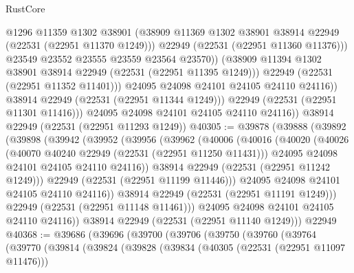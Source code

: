\begin{lexlean}{RustCore}
\begin{coremodule}
                        @1296
                        @11359
                        @1302
                        @38901
                        (@38909 @11369 @1302 @38901 @38914 @22949 (@22531 (@22951 @11370 @1249)))
                        @22949
                        (@22531 (@22951 @11360 @11376)))
                      @23549
                      @23552
                      @23555
                      @23559
                      @23564
                      @23570))
                  (@38909 @11394 @1302 @38901 @38914 @22949 (@22531 (@22951 @11395 @1249)))
                  @22949
                  (@22531 (@22951 @11352 @11401)))
                @24095
                @24098
                @24101
                @24105
                @24110
                @24116))
            @38914
            @22949
            (@22531 (@22951 @11344 @1249)))
          @22949
          (@22531 (@22951 @11301 @11416)))
        @24095
        @24098
        @24101
        @24105
        @24110
        @24116))
    @38914
    @22949
    (@22531 (@22951 @11293 @1249))
@40305 := @39878
    (@39888
      (@39892
        (@39898
          (@39942
            (@39952
              (@39956
                (@39962
                  (@40006
                    (@40016
                      (@40020
                        (@40026
                          (@40070 @40240 @22949 (@22531 (@22951 @11250 @11431)))
                          @24095
                          @24098
                          @24101
                          @24105
                          @24110
                          @24116))
                      @38914
                      @22949
                      (@22531 (@22951 @11242 @1249)))
                    @22949
                    (@22531 (@22951 @11199 @11446)))
                  @24095
                  @24098
                  @24101
                  @24105
                  @24110
                  @24116))
              @38914
              @22949
              (@22531 (@22951 @11191 @1249)))
            @22949
            (@22531 (@22951 @11148 @11461)))
          @24095
          @24098
          @24101
          @24105
          @24110
          @24116))
      @38914
      @22949
      (@22531 (@22951 @11140 @1249)))
    @22949
@40368 := @39686
    (@39696
      (@39700
        (@39706
          (@39750
            (@39760
              (@39764
                (@39770
                  (@39814
                    (@39824
                      (@39828
                        (@39834
                          (@40305 (@22531 (@22951 @11097 @11476)))

\end{coremodule}
\end{lexlean}
